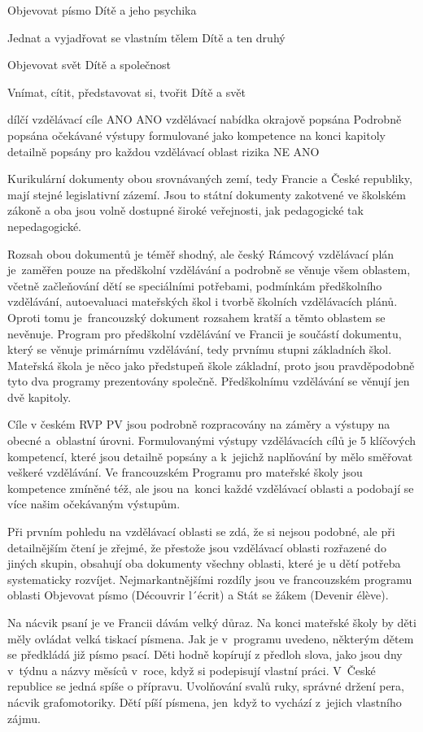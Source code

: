 Objevovat písmo
Dítě a jeho psychika

Jednat a vyjadřovat se vlastním tělem
Dítě a ten druhý

Objevovat svět
Dítě a společnost

Vnímat, cítit, představovat si, tvořit
Dítě a svět

dílčí vzdělávací cíle
ANO
ANO
vzdělávací nabídka
okrajově popsána
Podrobně popsána
očekávané výstupy
formulované jako kompetence na konci kapitoly
detailně popsány pro každou vzdělávací oblast
rizika
NE
ANO

Kurikulární dokumenty obou srovnávaných zemí, tedy Francie a České republiky, mají stejné legislativní zázemí. Jsou to státní dokumenty zakotvené ve školském zákoně a oba jsou volně dostupné široké veřejnosti, jak pedagogické tak nepedagogické. 

Rozsah obou dokumentů je téměř shodný, ale český Rámcový vzdělávací plán je zaměřen pouze na předškolní vzdělávání a podrobně se věnuje všem oblastem, včetně začleňování dětí se speciálními potřebami, podmínkám předškolního vzdělávání, autoevaluaci mateřských škol i tvorbě školních vzdělávacích plánů. Oproti tomu je francouzský dokument rozsahem kratší a těmto oblastem se nevěnuje. Program pro předškolní vzdělávání ve Francii je součástí dokumentu, který se věnuje primárnímu vzdělávání, tedy prvnímu stupni základních škol. Mateřská škola je něco jako předstupeň škole základní, proto jsou pravděpodobně tyto dva programy prezentovány společně. Předškolnímu vzdělávání se věnují jen dvě kapitoly.

Cíle v českém RVP PV jsou podrobně rozpracovány na záměry a výstupy na obecné a oblastní úrovni. Formulovanými výstupy vzdělávacích cílů je 5 klíčových kompetencí, které jsou detailně popsány a k jejichž naplňování by mělo směřovat veškeré vzdělávání. Ve francouzském Programu pro mateřské školy jsou kompetence zmíněné též, ale jsou na konci každé vzdělávací oblasti a podobají se více našim očekávaným výstupům.

Při prvním pohledu na vzdělávací oblasti se zdá, že si nejsou podobné, ale při detailnějším čtení je zřejmé, že přestože jsou vzdělávací oblasti rozřazené do jiných skupin, obsahují oba dokumenty všechny oblasti, které je u dětí potřeba systematicky rozvíjet. Nejmarkantnějšími rozdíly jsou ve francouzském programu oblasti Objevovat písmo (Découvrir l´écrit) a Stát se žákem (Devenir élève).

Na nácvik psaní je ve Francii dávám velký důraz. Na konci mateřské školy by děti měly ovládat velká tiskací písmena. Jak je v programu uvedeno, některým dětem se předkládá již písmo psací. Děti hodně kopírují z předloh slova, jako jsou dny v týdnu a názvy měsíců v roce, když si podepisují vlastní práci. V České republice se jedná spíše o přípravu. Uvolňování svalů ruky, správné držení pera, nácvik grafomotoriky. Dětí píší písmena, jen když to vychází z jejich vlastního zájmu. 

